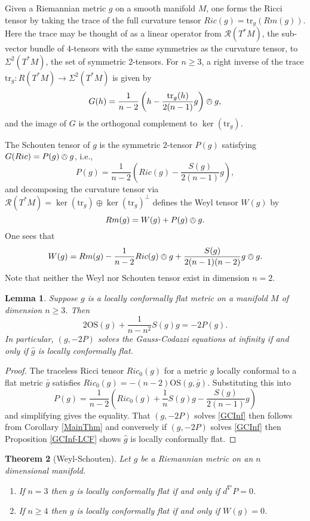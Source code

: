 \documentclass{amsart}
\newcommand{\tr}{\mathrm{tr}}
\newtheorem{thm}{Theorem}[section]
\newtheorem{lem}[thm]{Lemma}
\begin{document}
Given a Riemannian metric $g$ on a smooth manifold $M$, one forms the Ricci tensor by taking the trace of the full curvature tensor $Ric(g) = \tr_g(Rm(g))$.
Here the trace may be thought of as a linear operator from $\mathcal{R}(T^*M)$, the sub-vector bundle of 4-tensors with the same symmetries as the curvature tensor, to $\Sigma^2(T^*M)$, the set of symmetric 2-tensors.
For $n\geq 3$, a right inverse of the trace $\tr_g: R(T^*M) \to \Sigma^2(T^*M)$ is given by 
\[
G(h) = \frac{1}{n-2}\left( h - \frac{\tr_g(h)}{2(n-1)} g \right) \owedge g,
\]
and the image of $G$ is the orthogonal complement to $\ker(\tr_g)$.

The Schouten tensor of $g$ is the symmetric 2-tensor $P(g)$ satisfying $G(Ric) = P(g) \owedge g$, i.e., 
\[
P(g) = \frac{1}{n-2}\left( Ric(g) - \frac{S(g)}{2(n-1)} g \right),
\]
and decomposing the curvature tensor via $\mathcal{R}(T^*M) = \ker(\tr_g) \oplus \ker(\tr_g)^\perp$ defines the Weyl tensor $W(g)$ by 
\begin{equation}
\label{Weyl}
Rm(g) = W(g) + P(g)\owedge g.
\end{equation}
One sees that 
\[
W(g) = Rm(g) - \frac{1}{n-2}Ric(g) \owedge g + \frac{S(g)}{2(n-1)(n-2)} g \owedge g.
\]
Note that neither the Weyl nor Schouten tensor exist in dimension $n = 2$.
\begin{lem}
\label{SchoutenSolves}
Suppose $g$ is a locally conformally flat metric on a manifold $M$ of dimension $n \geq 3$. 
Then 
\[
2\mathrm{OS}(g) + \frac{1}{n-n^2}S(g)g = -2 P(g). 
\]
In particular, $(g,-2P)$ solves the Gauss-Codazzi equations at infinity if and only if $\hat{g}$ is locally conformally flat. 
\end{lem}

\begin{proof}
The traceless Ricci tensor $Ric_0(g)$ for a metric $g$ locally conformal to a flat metric $\bar{g}$ satisfies $Ric_0(g) = -(n-2)\mathrm{OS}(g,\bar{g})$.
Substituting this into
\[
P(g) = \frac{1}{n-2}\left( Ric_0(g) + \frac{1}{n}S(g)g - \frac{S(g)}{2(n-1)} g \right)
\]
and simplifying gives the equality.
That $(g,-2P)$ solves \ref{GCInf} then follows from Corollary \ref{MainThm} and conversely if $(g,-2P)$ solves \ref{GCInf} then Proposition \ref{GCInf-LCF} shows $\hat{g}$ is locally conformally flat. 
\end{proof}

\begin{thm}[Weyl-Schouten]
Let $g$ be a Riemannian metric on an $n$ dimensional manifold.

\begin{enumerate}
\item If $n = 3$ then $g$ is locally conformally flat if and only if $d^\nabla P = 0$.

\item If $n \geq 4$ then $g$ is locally conformally flat if and only if $W(g) = 0$.

\end{enumerate}
\end{thm}
\end{document}
